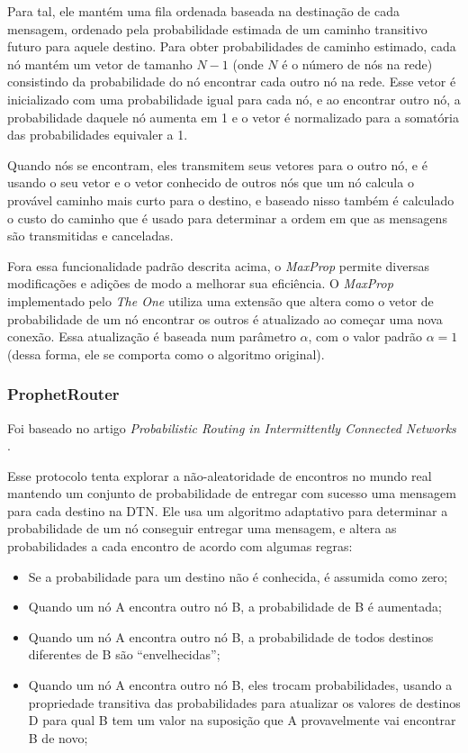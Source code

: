 \documentclass[conference]{IEEEtran}
\begin{document}
Para tal, ele mantém uma fila ordenada baseada na destinação de cada mensagem, ordenado pela probabilidade
estimada de um caminho transitivo futuro para aquele destino. Para obter probabilidades de caminho estimado,
cada nó mantém um vetor de tamanho $N-1$ (onde $N$ é o número de nós na rede) consistindo da probabilidade
do nó encontrar cada outro nó na rede. Esse vetor é inicializado com uma probabilidade igual para cada nó,
e ao encontrar outro nó, a probabilidade daquele nó aumenta em 1 e o vetor é normalizado para a somatória
das probabilidades equivaler a 1.

Quando nós se encontram, eles transmitem seus vetores para o outro nó, e é usando o seu vetor e o vetor
conhecido de outros nós que um nó calcula o provável caminho mais curto para o destino, e baseado nisso
também é calculado o custo do caminho que é usado para determinar a ordem em que as mensagens são transmitidas
e canceladas.

Fora essa funcionalidade padrão descrita acima, o \emph{MaxProp} permite diversas modificações e adições de modo a melhorar sua eficiência. O \emph{MaxProp} implementado pelo \emph{The One} utiliza uma extensão \cite{MaxPropRouter:adicao} que altera como o vetor de probabilidade de um nó encontrar os outros é atualizado ao começar uma nova conexão. Essa atualização é baseada num parâmetro $\alpha$, com o valor padrão $\alpha=1$ (dessa forma, ele se comporta como o algoritmo original).
 
\subsubsection{ProphetRouter}
Foi baseado no artigo \textit{Probabilistic Routing in Intermittently Connected Networks} \cite{ProphetRouter:original}.
 
Esse protocolo tenta explorar a não-aleatoridade de encontros no mundo real mantendo um conjunto de probabilidade de entregar com sucesso uma mensagem para cada destino na DTN. Ele usa um algoritmo adaptativo para determinar a probabilidade de um nó conseguir entregar uma mensagem, e altera as probabilidades a cada encontro de acordo com algumas regras:
\begin{itemize}
  \item Se a probabilidade para um destino não é conhecida, é assumida como zero;
  \item Quando um nó A encontra outro nó B, a probabilidade de B é aumentada;
  \item Quando um nó A encontra outro nó B, a probabilidade de todos destinos diferentes de B são \textquotedblleft envelhecidas\textquotedblright ;
  \item Quando um nó A encontra outro nó B, eles trocam probabilidades, usando a propriedade transitiva das probabilidades para atualizar os valores de destinos D para qual B tem um valor na suposição que A provavelmente vai encontrar B de novo;
\end{itemize}
\end{document}
